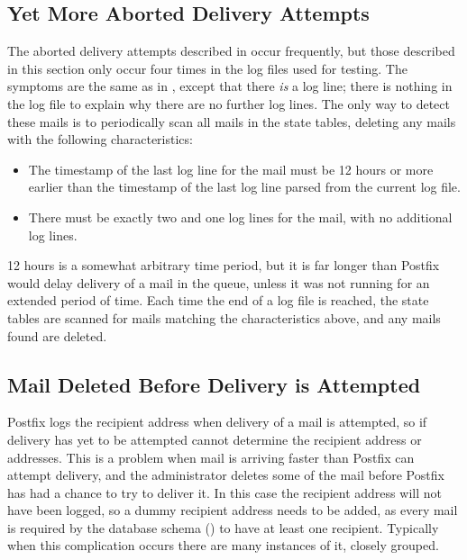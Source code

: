 \subsection{Yet More Aborted Delivery Attempts}

\label{yet more aborted delivery attempts}

The aborted delivery attempts described in  occur frequently, but those described in this section only occur
four times in the \numberOFlogFILES{} log files used for testing.  The
symptoms are the same as in , except
that there \textit{is\/} a  log line; there is nothing in
the log file to explain why there are no further log lines.  The only way
to detect these mails is to periodically scan all mails in the state
tables, deleting any mails with the following characteristics:

\begin{itemize}

    \item The timestamp of the last log line for the mail must be 12 hours
        or more earlier than the timestamp of the last log line parsed from
        the current log file.

    \item There must be exactly two  and one 
        log lines for the mail, with no additional log lines.

\end{itemize}

12 hours is a somewhat arbitrary time period, but it is far longer than
Postfix would delay delivery of a mail in the queue, unless it was not
running for an extended period of time.  Each time the end of a log file is
reached, the state tables are scanned for mails matching the
characteristics above, and any mails found are deleted.

\subsection{Mail Deleted Before Delivery is Attempted}

\label{Mail deleted before delivery is attempted}

Postfix logs the recipient address when delivery of a mail is attempted, so
if delivery has yet to be attempted \parsername{} cannot determine the
recipient address or addresses.  This is a problem when mail is arriving
faster than Postfix can attempt delivery, and the administrator deletes
some of the mail before Postfix has had a chance to try to deliver it.  In
this case the recipient address will not have been logged, so a dummy
recipient address needs to be added, as every mail is required by the
database schema () to have at least one
recipient.  Typically when this complication occurs there are many
instances of it, closely grouped.


